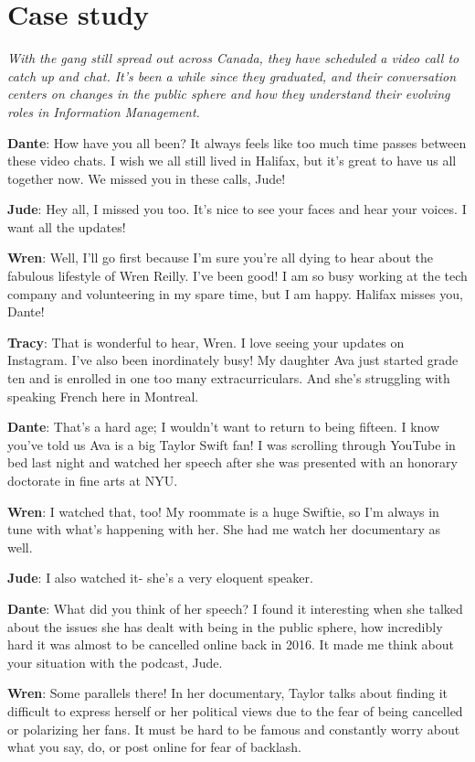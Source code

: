 \documentclass[
  letterpaper,
  DIV=11,
  numbers=noendperiod]{scrreprt}
\begin{document}
\section{Case study}\label{case-study-7}

\emph{With the gang still spread out across Canada, they have scheduled
a video call to catch up and chat. It's been a while since they
graduated, and their conversation centers on changes in the public
sphere and how they understand their evolving roles in Information
Management.}

\textbf{Dante}: How have you all been? It always feels like too much
time passes between these video chats. I wish we all still lived in
Halifax, but it's great to have us all together now. We missed you in
these calls, Jude!

\textbf{Jude}: Hey all, I missed you too. It's nice to see your faces
and hear your voices. I want all the updates!

\textbf{Wren}: Well, I'll go first because I'm sure you're all dying to
hear about the fabulous lifestyle of Wren Reilly. I've been good! I am
so busy working at the tech company and volunteering in my spare time,
but I am happy. Halifax misses you, Dante!

\textbf{Tracy}: That is wonderful to hear, Wren. I love seeing your
updates on Instagram. I've also been inordinately busy! My daughter Ava
just started grade ten and is enrolled in one too many extracurriculars.
And she's struggling with speaking French here in Montreal.

\textbf{Dante}: That's a hard age; I wouldn't want to return to being
fifteen. I know you've told us Ava is a big Taylor Swift fan! I was
scrolling through YouTube in bed last night and watched her speech after
she was presented with an honorary doctorate in fine arts at NYU.

\textbf{Wren}: I watched that, too! My roommate is a huge Swiftie, so
I'm always in tune with what's happening with her. She had me watch her
documentary as well.

\textbf{Jude}: I also watched it- she's a very eloquent speaker.

\textbf{Dante}: What did you think of her speech? I found it interesting
when she talked about the issues she has dealt with being in the public
sphere, how incredibly hard it was almost to be cancelled online back in
2016. It made me think about your situation with the podcast, Jude.

\textbf{Wren}: Some parallels there! In her documentary, Taylor talks
about finding it difficult to express herself or her political views due
to the fear of being cancelled or polarizing her fans. It must be hard
to be famous and constantly worry about what you say, do, or post online
for fear of backlash.
\end{document}
